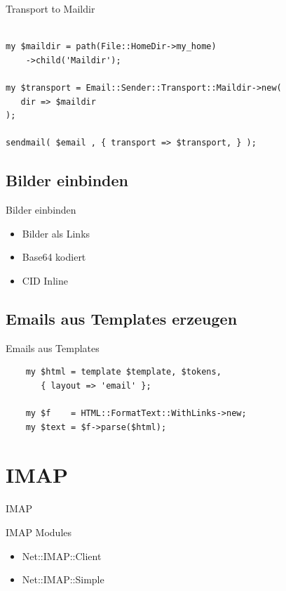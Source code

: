 \begin{frame}[fragile]{Transport to Maildir}
  \begin{lstlisting}

my $maildir = path(File::HomeDir->my_home)
    ->child('Maildir');

my $transport = Email::Sender::Transport::Maildir->new(
   dir => $maildir
);

sendmail( $email , { transport => $transport, } );

\end{lstlisting}
\end{frame}

\subsection{Bilder einbinden}

\begin{frame}{Bilder einbinden}
  \begin{itemize}
  \item Bilder als Links
  \item Base64 kodiert
  \item CID Inline
  \end{itemize}
\end{frame}


\subsection{Emails aus Templates erzeugen}

\begin{frame}[fragile]{Emails aus Templates}
  \begin{verbatim}
    my $html = template $template, $tokens,
       { layout => 'email' };

    my $f    = HTML::FormatText::WithLinks->new;
    my $text = $f->parse($html);
  \end{verbatim}
\end{frame}

\section{IMAP}

\begin{frame}{IMAP}
\end{frame}

\begin{frame}{IMAP Modules}
  \begin{itemize}
  \item Net::IMAP::Client
  \item Net::IMAP::Simple
  \end{itemize}
\end{frame}

